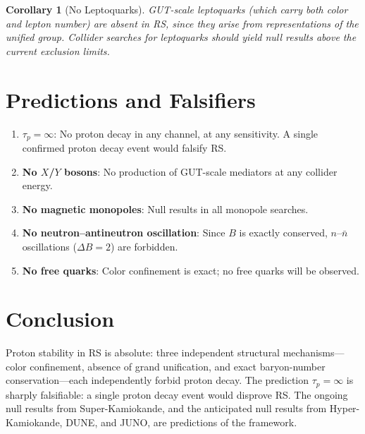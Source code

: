 \documentclass[12pt,a4paper]{article}
\newtheorem{corollary}[theorem]{Corollary}
\theoremstyle{definition}
\theoremstyle{remark}
\begin{document}
\begin{corollary}[No Leptoquarks]
\label{cor:leptoquarks}
GUT-scale leptoquarks (which carry both color and lepton
number) are absent in RS, since they arise from
representations of the unified group.  Collider searches
for leptoquarks should yield null results above the
current exclusion limits.
\end{corollary}

\section{Predictions and Falsifiers}
\label{sec:predictions}

\begin{enumerate}
  \item \textbf{$\tau_p = \infty$}: No proton decay in any
  channel, at any sensitivity.  A single confirmed proton
  decay event would falsify RS.

  \item \textbf{No $X$/$Y$ bosons}: No production of
  GUT-scale mediators at any collider energy.

  \item \textbf{No magnetic monopoles}: Null results in
  all monopole searches.

  \item \textbf{No neutron--antineutron oscillation}: Since
  $B$ is exactly conserved, $n$--$\bar{n}$ oscillations
  ($\Delta B = 2$) are forbidden.

  \item \textbf{No free quarks}: Color confinement is
  exact; no free quarks will be observed.
\end{enumerate}

\section{Conclusion}
\label{sec:conclusion}

Proton stability in RS is absolute: three independent
structural mechanisms---color confinement, absence of grand
unification, and exact baryon-number conservation---each
independently forbid proton decay.  The prediction
$\tau_p = \infty$ is sharply falsifiable: a single proton
decay event would disprove RS.  The ongoing null results
from Super-Kamiokande, and the anticipated null results
from Hyper-Kamiokande, DUNE, and JUNO, are predictions
of the framework.
\end{document}
